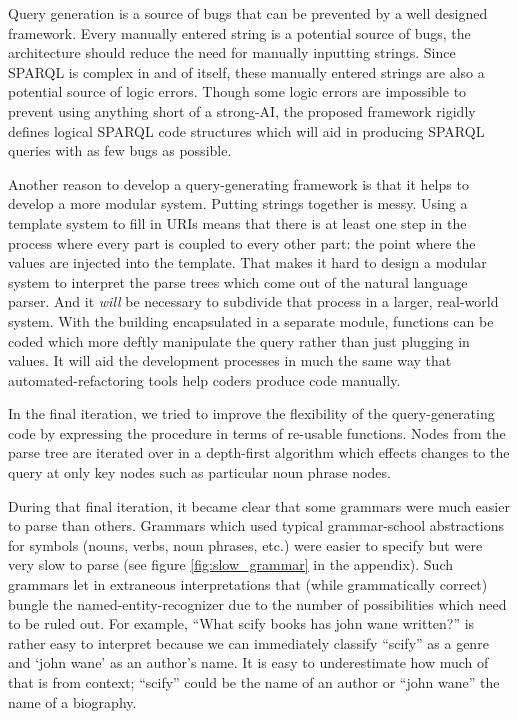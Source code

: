 \documentclass[11pt]{article}
\begin{document}
{Query generation is a source of bugs that can be prevented by a well
designed framework. Every manually entered string is a potential source of bugs, the
architecture should reduce the need for manually inputting strings. Since SPARQL is
complex in and of itself, these manually entered strings are also a potential source
of logic errors. Though some logic errors are impossible to prevent using anything short of
a strong-AI, the proposed framework rigidly defines logical SPARQL code structures which
will aid in producing SPARQL queries with as few bugs as possible. 

Another reason to develop a query-generating framework is that it helps to develop a more
modular system. Putting strings together is messy. Using a template system to
fill in URIs means that there is at least one step in the process where every part 
is coupled to every other part: the point where the values are injected into the template.
That makes it hard to design a modular system to interpret the parse trees which 
come out of the natural language parser. And it {\em will}
be necessary to subdivide that process in a larger, real-world system. With the building
encapsulated in a separate module, functions can be coded which more deftly manipulate
the query rather than just plugging in values. It will aid the development processes in
much the same way that automated-refactoring tools help coders produce code manually.

In the final iteration, we tried to improve the flexibility of the 
query-generating code by expressing the procedure in terms of re-usable
functions. Nodes from the parse tree are iterated over in a depth-first
algorithm which effects changes to the query at only key nodes such
as particular noun phrase nodes.

During that final iteration, it became clear that some grammars were much
easier to parse than others. Grammars which used typical grammar-school abstractions
for symbols (nouns, verbs, noun phrases, etc.) were easier to specify but were very
slow to parse (see figure \ref{fig:slow_grammar} in the appendix). Such grammars let in 
extraneous interpretations that (while grammatically
correct) bungle the named-entity-recognizer due to the number of possibilities which
need to be ruled out. For example, ``What scify books has john wane written?'' is rather
easy to interpret because we can immediately classify ``scify'' as a genre and `john wane'
as an author's name.
It is easy to underestimate how much of that is from context; ``scify'' could be the
name of an author or ``john wane'' the name of a biography.

}
\end{document}
